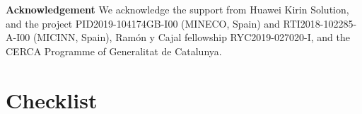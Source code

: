 \documentclass{article}
\begin{document}
{\textbf{Acknowledgement} 
We acknowledge the support from Huawei Kirin Solution, and the project PID2019-104174GB-I00 (MINECO, Spain) and RTI2018-102285-A-I00 (MICINN, Spain), Ramón y Cajal fellowship RYC2019-027020-I, and the CERCA Programme of Generalitat de Catalunya.
}

{\small


}





\appendix
\section*{Checklist}

\begin{comment}
The checklist follows the references.  Please
read the checklist guidelines carefully for information on how to answer these
questions.  For each question, change the default \answerTODO{} to \answerYes{},
\answerNo{}, or \answerNA{}.  You are strongly encouraged to include a {\bf
justification to your answer}, either by referencing the appropriate section of
your paper or providing a brief inline description.  For example:
\begin{itemize}
  \item Did you include the license to the code and datasets? \answerYes{See Section~\ref{gen_inst}.}
  \item Did you include the license to the code and datasets? \answerNo{The code and the data are proprietary.}
  \item Did you include the license to the code and datasets? \answerNA{}
\end{itemize}
Please do not modify the questions and only use the provided macros for your
answers.  Note that the Checklist section does not count towards the page
limit.  In your paper, please delete this instructions block and only keep the
Checklist section heading above along with the questions/answers below.
\end{comment}
\end{document}
